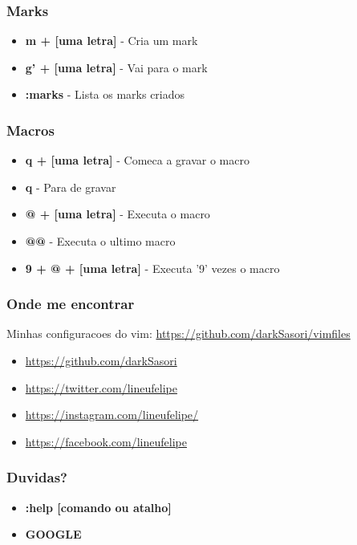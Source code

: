 \documentclass[aspectratio=169]{beamer}
\begin{document}
\begin{frame}\frametitle{Marks}
    \begin{itemize}
        \item \textbf{m + [uma letra]} - Cria um mark
        \item \textbf{g' + [uma letra]} - Vai para o mark
        \item \textbf{:marks} - Lista os marks criados
    \end{itemize}
\end{frame}

\begin{frame}\frametitle{Macros}
    \begin{itemize}
        \item \textbf{q + [uma letra]} - Comeca a gravar o macro
        \item \textbf{q} - Para de gravar
        \item \textbf{@ + [uma letra]} - Executa o macro
        \item \textbf{@@} - Executa o ultimo macro
        \item \textbf{9 + @ + [uma letra]} - Executa '9' vezes o macro
    \end{itemize}
\end{frame}

\begin{frame}\frametitle{Onde me encontrar}
    Minhas configuracoes do vim:
    \url{https://github.com/darkSasori/vimfiles}
    \begin{itemize}
        \item \url{https://github.com/darkSasori}
        \item \url{https://twitter.com/lineufelipe}
        \item \url{https://instagram.com/lineufelipe/}
        \item \url{https://facebook.com/lineufelipe}
    \end{itemize}
\end{frame}

\begin{frame}\frametitle{Duvidas?}
    \pause
    \begin{itemize}
        \item <1-> \textbf{:help [comando ou atalho]} \pause
        \item <2-> \textbf{GOOGLE}
    \end{itemize}
\end{frame}

{%
 }
\begin{frame}
\end{frame}
\end{document}
